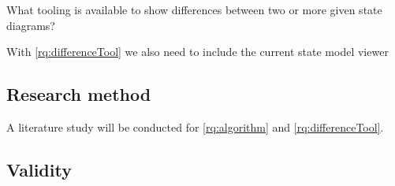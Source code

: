         
        \begin{questions}[resume]
            \item What tooling is available to show differences between two or more given state diagrams? \label{rq:differenceTool}
        \end{questions}
        
        With \ref{rq:differenceTool} we also need to include the current state model viewer \cite{thesisMulders}
        
        
        
        
        

    \subsection{Research method}
    
        A literature study will be conducted for \ref{rq:algorithm} and \ref{rq:differenceTool}. 
        
    
    
    \subsection{Validity}
    
